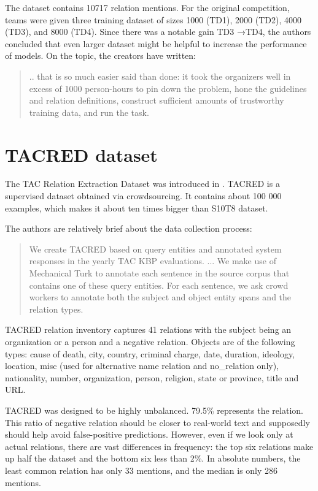 The dataset contains 10717 relation mentions. For the original competition, teams were given three training dataset of sizes 1000 (TD1), 2000 (TD2), 4000 (TD3), and 8000 (TD4). Since there was a notable gain TD3 →TD4, the authors concluded that even larger dataset might be helpful to increase the performance of models. On the topic, the creators have written:

\begin{quotation}.. that is so much easier said than done: it took the organizers well in excess of 1000 person-hours to pin down the problem, hone the guidelines and
relation definitions, construct sufficient amounts of trustworthy training data, and run the task.
\end{quotation}




\section{TACRED dataset}
The TAC Relation Extraction Dataset was introduced in \cite{zhang2017tacred}. TACRED is a supervised dataset obtained via crowdsourcing. It contains about 100 000 examples, which makes it about ten times bigger than S10T8 dataset. 

The authors are relatively brief about the data collection process:

\begin{quote}
We create TACRED based on query entities and annotated system responses in the yearly TAC KBP evaluations. ... We make use of Mechanical Turk to annotate each sentence in the source corpus that contains one of these query entities. For each sentence, we ask crowd workers to annotate both the subject and object entity spans and the relation types.
\end{quote}

TACRED relation inventory captures 41 relations with the subject being an organization or a person and a negative relation. Objects are of the following types: cause of death, city, country, criminal charge, date, duration, ideology, location, misc (used for alternative name relation and no\_relation only), nationality, number, organization, person, religion, state or province, title and URL.


TACRED was designed to be highly unbalanced. 79.5\% represents the   relation. This ratio of negative relation should be closer to real-world text and supposedly should help avoid false-positive predictions. However, even if we look only at actual relations, there are vast differences in frequency: the top six relations make up half the dataset and the bottom six less than 2\%. In absolute numbers, the least common  relation has only 33 mentions, and the median is only 286 mentions.
 


